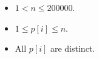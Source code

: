 \begin{itemize}
\tightlist
\item $1< n\le 200000$.
\item $1\le p[i] \le n$.
\item All $p[i]$ are distinct.
\end{itemize}
\newpage
